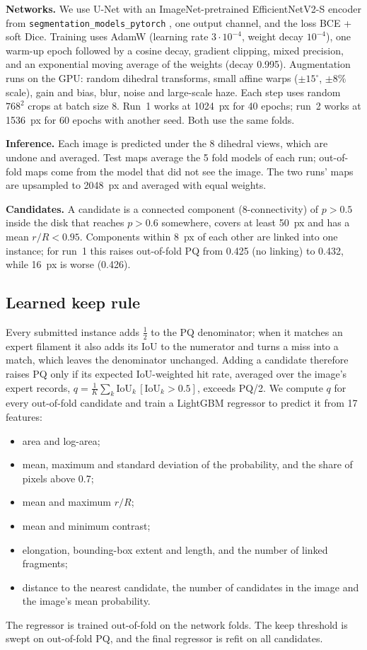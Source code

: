 \documentclass[sigconf]{acmart}
\begin{document}
\textbf{Networks.} We use U-Net \cite{ronneberger2015unet} with an ImageNet-pretrained EfficientNetV2-S encoder \cite{tan2021efficientnetv2} from \texttt{segmentation\_models\_pytorch} \cite{iakubovskii2019smp}, one output channel, and the loss BCE + soft Dice. Training uses AdamW (learning rate $3\cdot10^{-4}$, weight decay $10^{-4}$), one warm-up epoch followed by a cosine decay, gradient clipping, mixed precision, and an exponential moving average of the weights (decay 0.995). Augmentation runs on the GPU: random dihedral transforms, small affine warps ($\pm15^\circ$, $\pm8\%$ scale), gain and bias, blur, noise and large-scale haze. Each step uses random $768^2$ crops at batch size 8. Run~1 works at 1024~px for 40 epochs; run~2 works at 1536~px for 60 epochs with another seed. Both use the same folds.

\textbf{Inference.} Each image is predicted under the 8 dihedral views, which are undone and averaged. Test maps average the 5 fold models of each run; out-of-fold maps come from the model that did not see the image. The two runs' maps are upsampled to 2048~px and averaged with equal weights.

\textbf{Candidates.} A candidate is a connected component (8-connectivity) of $p>0.5$ inside the disk that reaches $p>0.6$ somewhere, covers at least 50~px and has a mean $r/R<0.95$. Components within 8~px of each other are linked into one instance; for run~1 this raises out-of-fold PQ from 0.425 (no linking) to 0.432, while 16~px is worse (0.426).

\subsection{Learned keep rule}\label{sec:keep}
Every submitted instance adds $\tfrac12$ to the PQ denominator; when it matches an expert filament it also adds its IoU to the numerator and turns a miss into a match, which leaves the denominator unchanged. Adding a candidate therefore raises PQ only if its expected IoU-weighted hit rate, averaged over the image's expert records, $q=\frac1{K}\sum_k \mathrm{IoU}_k\,[\mathrm{IoU}_k>0.5]$, exceeds PQ/2. We compute $q$ for every out-of-fold candidate and train a LightGBM regressor \cite{ke2017lightgbm} to predict it from 17 features:
\begin{itemize}
    \item area and log-area;
    \item mean, maximum and standard deviation of the probability, and the share of pixels above 0.7;
    \item mean and maximum $r/R$;
    \item mean and minimum contrast;
    \item elongation, bounding-box extent and length, and the number of linked fragments;
    \item distance to the nearest candidate, the number of candidates in the image and the image's mean probability.
\end{itemize}
The regressor is trained out-of-fold on the network folds. The keep threshold is swept on out-of-fold PQ, and the final regressor is refit on all candidates.
\end{document}
